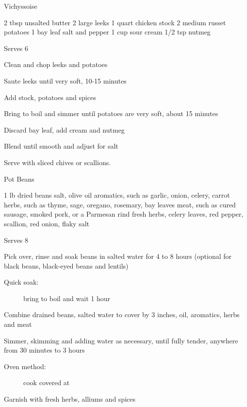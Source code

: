 \begin{recipe}{Vichyssoise}{\vegetarian{}}
\begin{ingredients}
2 tbsp unsalted butter
2 large leeks
1 quart chicken stock
2 medium russet potatoes
1 bay leaf
salt and pepper
1 cup sour cream
1/2 tsp nutmeg
\end{ingredients}
\nextcolumn
Serves 6
\begin{steps}
    \item Clean and chop leeks and potatoes
    \item Saute leeks until very soft, 10-15 minutes
    \item Add stock, potatoes and spices
    \item Bring to boil and simmer until potatoes are very soft, about 15 minutes
    \item Discard bay leaf, add cream and nutmeg
    \item Blend until smooth and adjust for salt
\end{steps}
Serve with sliced chives or scallions.
\end{recipe}

\begin{denserecipe}{Pot Beans}{}
\begin{ingredients}
1 lb dried beans
salt, olive oil
aromatics, such as garlic, onion, celery, carrot
herbs, such as thyme, sage, oregano, rosemary, bay leaves
meat, such as cured \ibreak sausage, smoked pork, or a Parmesan rind
fresh herbs, celery leaves, red pepper, scallion, red onion, flaky salt
\end{ingredients}
\nextcolumn
Serves 8
\begin{steps}
    \item Pick over, rinse and soak beans in salted water for 4 to 8 hours (optional for black beans, black-eyed beans and lentils)
    \begin{description}
        \item[Quick soak:] bring to boil and wait 1 hour
    \end{description}
    \item Combine drained beans, salted water to cover by 3 inches, oil, aromatics, herbs and meat
    \item Simmer, skimming and adding water as necessary, until fully tender, anywhere from 30 minutes to 3 hours
    \begin{description}
        \item[Oven method:] cook covered at 
    \end{description}
    \item Garnish with fresh herbs, alliums and spices
\end{steps}
\end{denserecipe}

